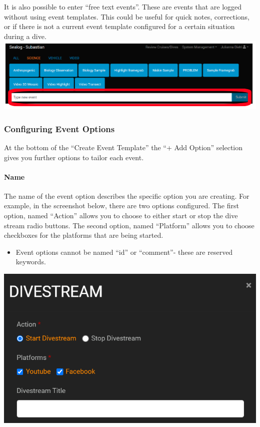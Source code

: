 \documentclass[
  letterpaper,
  DIV=11,
  numbers=noendperiod]{scrreprt}
\let\oldparagraph\paragraph
\renewcommand{\paragraph}[1]{\oldparagraph{#1}\mbox{}}
\providecommand{\tightlist}{%
  \setlength{\itemsep}{0pt}\setlength{\parskip}{0pt}}\usepackage{longtable,booktabs,array}
\begin{document}
It is also possible to enter ``free text events''. These are events that
are logged without using event templates. This could be useful for quick
notes, corrections, or if there is not a current event template
configured for a certain situation during a dive.
\includegraphics{images/freetext.png}

\hypertarget{configuring-event-options}{%
\subsubsection{Configuring Event
Options}\label{configuring-event-options}}

At the bottom of the ``Create Event Template'' the ``+ Add Option''
selection gives you further options to tailor each event.

\hypertarget{name}{%
\paragraph{Name}\label{name}}

The name of the event option describes the specific option you are
creating. For example, in the screenshot below, there are two options
configured. The first option, named ``Action'' allows you to choose to
either start or stop the dive stream radio buttons. The second option,
named ``Platform'' allows you to choose checkboxes for the platforms
that are being started.

\begin{itemize}
\tightlist
\item
  Event options cannot be named ``id'' or ``comment''- these are
  reserved keywords.
\end{itemize}

\includegraphics{images/image8.png}
\end{document}

